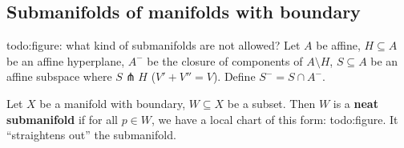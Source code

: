 \subsection{Submanifolds of manifolds with boundary}
{\color{red}todo:figure: what kind of submanifolds are not allowed?} 
Let $A$ be affine, $H \subseteq A$ be an affine hyperplane, $A^-$ be the closure of components of $A \setminus H$, $S \subseteq A$ be an affine subspace where $S\pitchfork H$ ($V' +V''=V$). Define $S^-=S \cap  A^-$.
\begin{definition}[]
    Let $X$ be a manifold with boundary, $W \subseteq X$ be a subset. Then $W$ is a \textbf{neat submanifold} if for all $p \in W$, we have a local chart of this form: {\color{red}todo:figure}. It ``straightens out'' the submanifold.
\end{definition}

